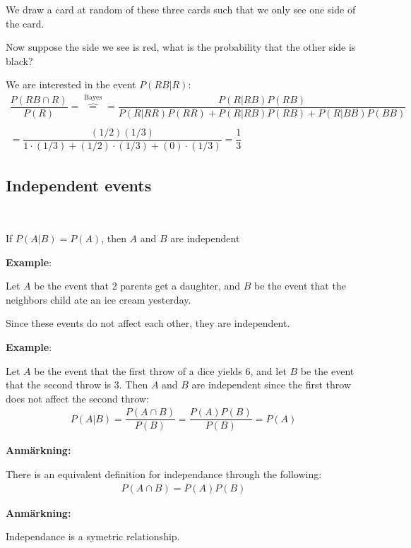 \par\bigskip
\noindent We draw a card at random of these three cards such that we only see one side of the card.\par
\noindent Now suppose the side we see is red, what is the probability that the other side is black?
\par\bigskip
\noindent We are interested in the event $P(RB|R)$:
\begin{equation*}
  \begin{gathered}
    \dfrac{P(RB\cap R)}{P(R)}=\overbrace{=}^{\text{Bayes}} =\dfrac{P(R|RB)P(RB)}{P(R|RR)P(RR)+P(R|RB)P(RB)+P(R|BB)P(BB)}\\\\
    = \dfrac{(1/2)(1/3)}{1\cdot (1/3)+(1/2)\cdot(1/3)+(0)\cdot (1/3)} = \dfrac{1}{3}
  \end{gathered}
\end{equation*}
\par\bigskip
\subsection{Independent events}\hfill\\\par
\begin{theo}{}
  If $P(A|B) = P(A)$, then $A$ and $B$ are independent
\end{theo}
\par\bigskip
\noindent\textbf{Example}:\par
\noindent Let $A$ be the event that 2 parents get a daughter, and $B$ be the event that the neighbors child ate an ice cream yesterday.\par
\noindent Since these events do not affect each other, they are independent.
\par\bigskip
\noindent\textbf{Example}:\par
\noindent Let $A$ be the event that the first throw of a dice yields 6, and let $B$ be the event that the second throw is 3. Then $A$ and $B$ are independent since the first throw does not affect the second throw:
\begin{equation*}
  \begin{gathered}
    P(A|B) = \dfrac{P(A\cap B)}{P(B)} = \dfrac{P(A)P(B)}{P(B)} = P(A)
  \end{gathered}
\end{equation*}
\par\bigskip
\noindent\textbf{Anmärkning:}\par
\noindent There is an equivalent definition for independance through the following:
\begin{equation*}
  \begin{gathered}
    P(A\cap B) = P(A)P(B)
  \end{gathered}
\end{equation*}
\par\bigskip
\noindent\textbf{Anmärkning:}\par
\noindent Independance is a symetric relationship.
\par\bigskip
